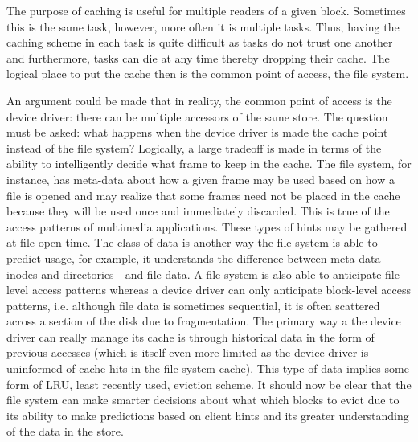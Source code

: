 The purpose of caching is useful for multiple readers of a given
block.  Sometimes this is the same task, however, more often it is
multiple tasks.  Thus, having the caching scheme in each task is quite
difficult as tasks do not trust one another and furthermore, tasks can
die at any time thereby dropping their cache.  The logical place to
put the cache then is the common point of access, the file system.

An argument could be made that in reality, the common point of access
is the device driver: there can be multiple accessors of the same
store.  The question must be asked: what happens when the device
driver is made the cache point instead of the file system?  Logically,
a large tradeoff is made in terms of the ability to intelligently
decide what frame to keep in the cache.  The file system, for
instance, has meta-data about how a given frame may be used based on
how a file is opened and may realize that some frames need not be
placed in the cache because they will be used once and immediately
discarded.  This is true of the access patterns of multimedia
applications.  These types of hints may be gathered at file open time.
The class of data is another way the file system is able to predict
usage, for example, it understands the difference between
meta-data---inodes and directories---and file data.  A file system is
also able to anticipate file-level access patterns whereas a device
driver can only anticipate block-level access patterns, i.e. although
file data is sometimes sequential, it is often scattered across a
section of the disk due to fragmentation.  The primary way a the
device driver can really manage its cache is through historical data
in the form of previous accesses (which is itself even more limited as
the device driver is uninformed of cache hits in the file system
cache).  This type of data implies some form of LRU, least recently
used, eviction scheme.  It should now be clear that the file system
can make smarter decisions about what which blocks to evict due to its
ability to make predictions based on client hints and its greater
understanding of the data in the store.

